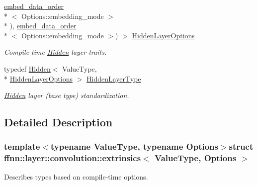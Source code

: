 \begin{DoxyCompactItemize}
\hyperlink{namespaceffnn_1_1layer_1_1convolution_a88d0a4ec4a7dbc89c35ce95d859a78cf}{embed\-\_\-data\-\_\-order}\\*
$<$ Options\-::embedding\-\_\-mode $>$\\*
), \hyperlink{namespaceffnn_1_1layer_1_1convolution_a88d0a4ec4a7dbc89c35ce95d859a78cf}{embed\-\_\-data\-\_\-order}\\*
$<$ Options\-::embedding\-\_\-mode $>$) $>$ \hyperlink{structffnn_1_1layer_1_1convolution_1_1extrinsics_a301768029fa1eb16a28981139c8122ce}{Hidden\-Layer\-Options}
\begin{DoxyCompactList}\small\item\em Compile-\/time \hyperlink{classffnn_1_1layer_1_1_hidden}{Hidden} layer traits. \end{DoxyCompactList}\item 
typedef \hyperlink{classffnn_1_1layer_1_1_hidden}{Hidden}$<$ Value\-Type, \\*
\hyperlink{structffnn_1_1layer_1_1convolution_1_1extrinsics_a301768029fa1eb16a28981139c8122ce}{Hidden\-Layer\-Options} $>$ \hyperlink{structffnn_1_1layer_1_1convolution_1_1extrinsics_a92f9ad843e8bb328d35604bdb4d6c87f}{Hidden\-Layer\-Type}
\begin{DoxyCompactList}\small\item\em \hyperlink{classffnn_1_1layer_1_1_hidden}{Hidden} layer (base type) standardization. \end{DoxyCompactList}\end{DoxyCompactItemize}


\subsection{Detailed Description}
\subsubsection*{template$<$typename Value\-Type, typename Options$>$struct ffnn\-::layer\-::convolution\-::extrinsics$<$ Value\-Type, Options $>$}

Describes types based on compile-\/time options. 

